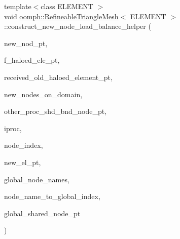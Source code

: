 {\footnotesize\ttfamily template$<$class E\+L\+E\+M\+E\+NT $>$ \\
void \hyperlink{classoomph_1_1RefineableTriangleMesh}{oomph\+::\+Refineable\+Triangle\+Mesh}$<$ E\+L\+E\+M\+E\+NT $>$\+::construct\+\_\+new\+\_\+node\+\_\+load\+\_\+balance\+\_\+helper (\begin{DoxyParamCaption}\item[{\hyperlink{classoomph_1_1Node}{Node} $\ast$\&}]{new\+\_\+nod\+\_\+pt,  }\item[{\hyperlink{classoomph_1_1Vector}{Vector}$<$ \hyperlink{classoomph_1_1Vector}{Vector}$<$ \hyperlink{classoomph_1_1FiniteElement}{Finite\+Element} $\ast$$>$ $>$ \&}]{f\+\_\+haloed\+\_\+ele\+\_\+pt,  }\item[{\hyperlink{classoomph_1_1Vector}{Vector}$<$ \hyperlink{classoomph_1_1Vector}{Vector}$<$ std\+::map$<$ unsigned, \hyperlink{classoomph_1_1FiniteElement}{Finite\+Element} $\ast$$>$ $>$ $>$ \&}]{received\+\_\+old\+\_\+haloed\+\_\+element\+\_\+pt,  }\item[{\hyperlink{classoomph_1_1Vector}{Vector}$<$ \hyperlink{classoomph_1_1Node}{Node} $\ast$$>$ \&}]{new\+\_\+nodes\+\_\+on\+\_\+domain,  }\item[{\hyperlink{classoomph_1_1Vector}{Vector}$<$ \hyperlink{classoomph_1_1Vector}{Vector}$<$ \hyperlink{classoomph_1_1Vector}{Vector}$<$ std\+::map$<$ unsigned, \hyperlink{classoomph_1_1Node}{Node} $\ast$$>$ $>$ $>$ $>$ \&}]{other\+\_\+proc\+\_\+shd\+\_\+bnd\+\_\+node\+\_\+pt,  }\item[{unsigned \&}]{iproc,  }\item[{unsigned \&}]{node\+\_\+index,  }\item[{\hyperlink{classoomph_1_1FiniteElement}{Finite\+Element} $\ast$const \&}]{new\+\_\+el\+\_\+pt,  }\item[{\hyperlink{classoomph_1_1Vector}{Vector}$<$ \hyperlink{classoomph_1_1Vector}{Vector}$<$ \hyperlink{classoomph_1_1Vector}{Vector}$<$ unsigned $>$ $>$ $>$ \&}]{global\+\_\+node\+\_\+names,  }\item[{std\+::map$<$ \hyperlink{classoomph_1_1Vector}{Vector}$<$ unsigned $>$, unsigned $>$ \&}]{node\+\_\+name\+\_\+to\+\_\+global\+\_\+index,  }\item[{\hyperlink{classoomph_1_1Vector}{Vector}$<$ \hyperlink{classoomph_1_1Node}{Node} $\ast$$>$ \&}]{global\+\_\+shared\+\_\+node\+\_\+pt }\end{DoxyParamCaption})\hspace{0.3cm}{\ttfamily [protected]}}



